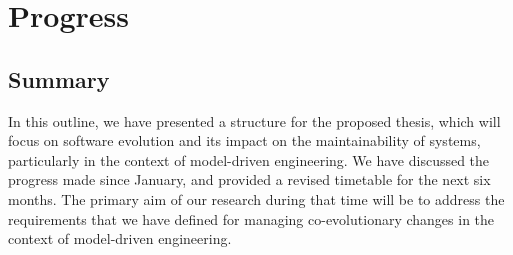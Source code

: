 

\section{Progress}
\label{sec:progress}





\subsection{Summary}
In this outline, we have presented a structure for the proposed thesis, which will focus on software evolution and its impact on the maintainability of systems, particularly in the context of model-driven engineering. We have discussed the progress made since January, and provided a revised timetable for the next six months. The primary aim of our research during that time will be to address the requirements that we have defined for managing co-evolutionary changes in the context of model-driven engineering.